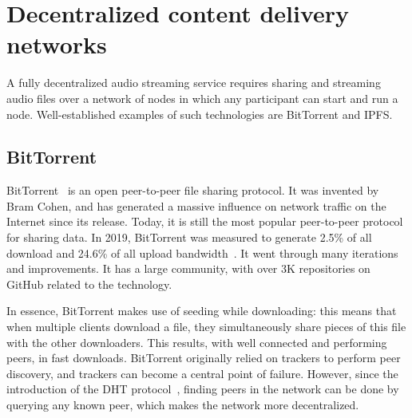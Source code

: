 
\section{Decentralized content delivery networks}
\label{sec:decentralized-content-delivery}
A fully decentralized audio streaming service requires sharing and streaming audio files over a network of nodes in which any participant can start and run a node. Well-established examples of such technologies are BitTorrent and IPFS.

\subsection{BitTorrent}
\label{sec:sote-bittorrent}
BitTorrent~\citep{cohen2002bittorrent} is an open peer-to-peer file sharing protocol. It was invented by Bram Cohen, and has generated a massive influence on network traffic on the Internet since its release. Today, it is still the most popular peer-to-peer protocol for sharing data. In 2019, BitTorrent was measured to generate 2.5\% of all download and 24.6\% of all upload bandwidth~\citep{marozzo2020}. It went through many iterations and improvements. It has a large community, with over 3K repositories on GitHub related to the technology.

In essence, BitTorrent makes use of seeding while downloading: this means that when multiple clients download a file, they simultaneously share pieces of this file with the other downloaders. This results, with well connected and performing peers, in fast downloads. BitTorrent originally relied on trackers to perform peer discovery, and trackers can become a central point of failure. However, since the introduction of the DHT protocol~\citep{bittorrentbep5dht}, finding peers in the network can be done by querying any known peer, which makes the network more decentralized. 



